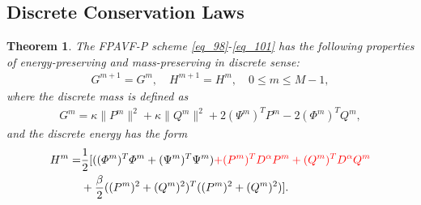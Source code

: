 \documentclass[preprint,compress,3p,10pt,fleqn]{elsarticle}
\numberwithin{equation}{section}
\newtheorem{theorem}{Theorem}[section]
\begin{document}
\subsection{Discrete Conservation Laws}
\begin{theorem}\label{thm4}
The FPAVF-P scheme \eqref{eq_98}-\eqref{eq_101} has the following properties of energy-preserving and mass-preserving in discrete sense:
\begin{align}\label{eq_11141}
G^{m+1}=G^{m}, \quad H^{m+1}=H^{m}, \quad 0 \leq m \leq M-1,
\end{align}
where the discrete mass is defined as
\begin{align}\label{eq_11142}
G^{m}=\kappa\|P^{m}\|^2+\kappa\|Q^{m}\|^2+2 \left(\Psi^{m}\right)^T P^{m}-2 \left(\varPhi^{m}\right)^T Q^{m},
\end{align}
and the discrete energy has the form
\begin{align}
H^{m}=&\frac{1}{2}[((\varPhi^{m})^{T}\varPhi^{m}+(\Psi^{m})^{T}\Psi^{m})\textcolor[rgb]{1.00,0.00,0.00}{+(P^{m})^{T} D^{\alpha} P^{m}+(Q^{m})^{T} D^{\alpha} Q^{m}}\nonumber\\
&+\frac{\beta}{2}((P^{m})^2+(Q^{m})^2)^{T}((P^{m})^2+(Q^{m})^2)].\label{eq_800}
\end{align}
\end{theorem}
\end{document}
